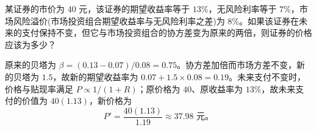 \begin{problem}
 某证券的市价为 \num{40} 元，该证券的期望收益率等于 $13\%$，无风险利率等于 $7\%$，市场风险溢价(市场投资组合期望收益率与无风险利率之差)为 $8\%$。如果该证券在未来的支付保持不变，但它与市场投资组合的协方差变为原来的两倍，则证券的价格应该为多少？
\end{problem}
\begin{solution}
原来的贝塔为 $\beta=(0.13-0.07)/0.08=0.75$。协方差加倍而市场方差不变，新的贝塔为 $1.5$，故新的期望收益率为 $0.07+1.5\times0.08=0.19$。未来支付不变时，价格与贴现率满足 $P\propto1/(1+R)$；原价格为 $40$、原收益率为 $13\%$，故未来支付的价值为 $40(1.13)$，新价格为
\[
P'=\frac{40(1.13)}{1.19}\approx37.98\text{ 元}。
\]
\end{solution}
